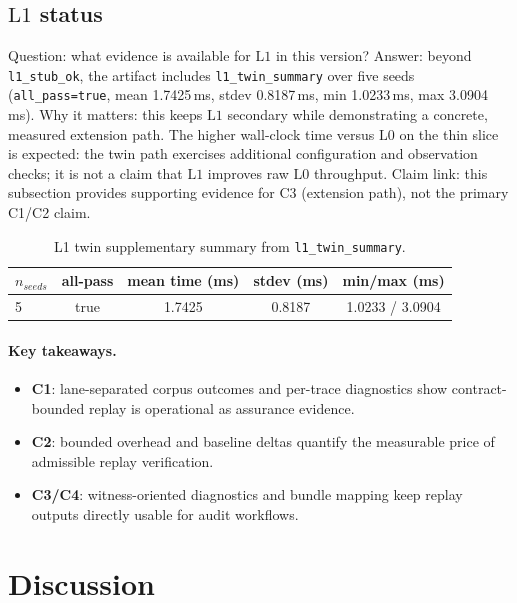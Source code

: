 \documentclass[11pt]{article}
\newcommand{\field}[1]{\texttt{#1}}
\newcommand{\Lzero}{\ensuremath{\mathrm{L0}}}
\newcommand{\Lone}{\ensuremath{\mathrm{L1}}}
\begin{document}
\subsection{\Lone{} status}

Question: what evidence is available for \Lone{} in this version?  
Answer: beyond \field{l1\_stub\_ok}, the artifact includes \field{l1\_twin\_summary} over five seeds (\field{all\_pass=true}, mean 1.7425\,ms, stdev 0.8187\,ms, min 1.0233\,ms, max 3.0904\,ms).  
Why it matters: this keeps \Lone{} secondary while demonstrating a concrete, measured extension path. The higher wall-clock time versus \Lzero{} on the thin slice is expected: the twin path exercises additional configuration and observation checks; it is not a claim that \Lone{} improves raw \Lzero{} throughput.
Claim link: this subsection provides supporting evidence for C3 (extension path), not the primary C1/C2 claim.

\begin{table}[H]
\centering
\caption{L1 twin supplementary summary from \field{l1\_twin\_summary}.}
\label{tab:l1-supp}
\begin{tabular}{lcccc}
\toprule
$n_{seeds}$ & all-pass & mean time (ms) & stdev (ms) & min/max (ms) \\
\midrule
5 & true & 1.7425 & 0.8187 & 1.0233 / 3.0904 \\
\bottomrule
\end{tabular}
\end{table}

\paragraph{Key takeaways.}
\begin{itemize}[leftmargin=1.5em]
    \item \textbf{C1}: lane-separated corpus outcomes and per-trace diagnostics show contract-bounded replay is operational as assurance evidence.
    \item \textbf{C2}: bounded overhead and baseline deltas quantify the measurable price of admissible replay verification.
    \item \textbf{C3/C4}: witness-oriented diagnostics and bundle mapping keep replay outputs directly usable for audit workflows.
\end{itemize}

\section{Discussion}
\end{document}
